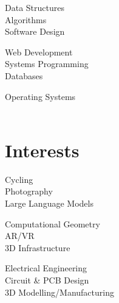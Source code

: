 \documentclass[letterpaper,11pt]{article}
\begin{document}
\begin{multicols}{3}
  \begin{flushleft}
    \small{
      Data Structures \\
      Algorithms \\
      Software Design
    }
  \end{flushleft}

  \begin{flushleft}
    \small{
      Web Development \\
      Systems Programming \\
      Databases
    }
  \end{flushleft}

  \begin{flushleft}
    \small{
      Operating Systems \\
      ~
    }
  \end{flushleft}
\end{multicols}
\vspace{-10pt}

\section{Interests}
\begin{multicols}{3}
  \begin{flushleft}
    \small{
      Cycling \\
      Photography \\
      Large Language Models
    }
  \end{flushleft}

  \begin{flushleft}
    \small{
      Computational Geometry \\
      AR/VR \\
      3D Infrastructure
    }
  \end{flushleft}

  \begin{flushleft}
    \small{
      Electrical Engineering \\
      Circuit \& PCB Design \\
      3D Modelling/Manufacturing
    }
  \end{flushleft}
\end{multicols}
\vspace{-16pt}
\end{document}
